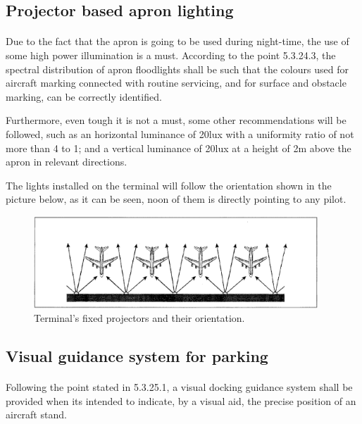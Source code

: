 		\subsection{Projector based apron lighting}
		\paragraph{}Due to the fact that the apron is going to be used during night-time, the use of some high power illumination is a must. According to the point 5.3.24.3, the spectral distribution of apron floodlights shall be such that the colours used for aircraft marking connected with routine servicing, and for surface and obstacle marking, can be correctly identified.
		
		Furthermore, even tough it is not a must, some other recommendations will be followed, such as an horizontal luminance of 20lux with a uniformity ratio of not more than 4 to 1; and a vertical luminance of 20lux at a height of 2m above the apron in relevant directions. 
		
		The lights installed on the terminal will follow the orientation shown in the picture below, as it can be seen, noon of them is directly pointing to any pilot.
		
		\begin{figure}[H]
			\centering
			\includegraphics[clip, trim=0.3cm 0.3cm 0.3cm 0.3cm, width=0.95\textwidth]{./images/lights/apronlights}
			\caption{Terminal's fixed projectors and their orientation.} %
			\label{} %
		\end{figure}
		
		
		\subsection{Visual guidance system for parking}
		\paragraph{}Following the point stated in 5.3.25.1, a visual docking guidance system shall be provided when its intended to indicate, by a visual aid, the precise position of an aircraft stand. 
		
